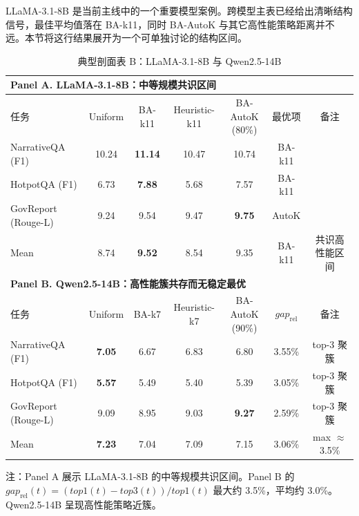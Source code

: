 LLaMA-3.1-8B 是当前主线中的一个重要模型案例。跨模型主表已经给出清晰结构信号，最佳平均值落在 BA-k11，同时 BA-AutoK 与其它高性能策略距离并不远。本节将这行结果展开为一个可单独讨论的结构区间。

\begin{table}[H]
  \centering
  \caption{典型剖面表 B：LLaMA-3.1-8B 与 Qwen2.5-14B}
  \label{tab:ch4-profile-b}
  \label{tab:t6-14b-toptier}
  {%
  \footnotesize
  \setlength{\tabcolsep}{4pt}
  \renewcommand{\arraystretch}{1.05}
  \begin{tabular}{lcccccc}
    \toprule
    \multicolumn{7}{l}{\textbf{Panel A. LLaMA-3.1-8B：中等规模共识区间}} \\
    \midrule
    任务 & Uniform & BA-k11 & Heuristic-k11 & \makecell[c]{BA-AutoK\\(80\%)} & 最优项 & 备注 \\
    \midrule
    NarrativeQA (F1)    & 10.24 & \textbf{11.14} & 10.47 & 10.74 & BA-k11 & \\
    HotpotQA (F1)       & 6.73  & \textbf{7.88}  & 5.68  & 7.57  & BA-k11 & \\
    GovReport (Rouge-L) & 9.24  & 9.54 & 9.47 & \textbf{9.75} & AutoK & \\
    Mean                & 8.74  & \textbf{9.52} & 8.54 & 9.35 & BA-k11 & 共识高性能区间 \\
    \midrule
    \multicolumn{7}{l}{\textbf{Panel B. Qwen2.5-14B：高性能簇共存而无稳定最优}} \\
    \midrule
    任务 & Uniform & BA-k7 & Heuristic-k7 & \makecell[c]{BA-AutoK\\(90\%)} & $gap_{\mathrm{rel}}$ & 备注 \\
    \midrule
    NarrativeQA (F1)    & \textbf{7.05} & 6.67 & 6.83 & 6.80 & 3.55\% & top-3 聚簇 \\
    HotpotQA (F1)       & \textbf{5.57} & 5.49 & 5.40 & 5.39 & 3.05\% & top-3 聚簇 \\
    GovReport (Rouge-L) & 9.09 & 8.95 & 9.03 & \textbf{9.27} & 2.59\% & top-3 聚簇 \\
    Mean                & \textbf{7.23} & 7.04 & 7.09 & 7.15 & 3.06\% & max $\approx$ 3.5\% \\
    \bottomrule
  \end{tabular}

  \vspace{0.35em}
  \begin{minipage}{0.94\linewidth}
    \footnotesize
    注：Panel A 展示 LLaMA-3.1-8B 的中等规模共识区间。Panel B 的 \mbox{$gap_{\mathrm{rel}}(t)=(top1(t)-top3(t))/top1(t)$} 最大约 3.5\%，平均约 3.0\%。Qwen2.5-14B 呈现高性能策略近簇。

  \end{minipage}
  }
\end{table}

